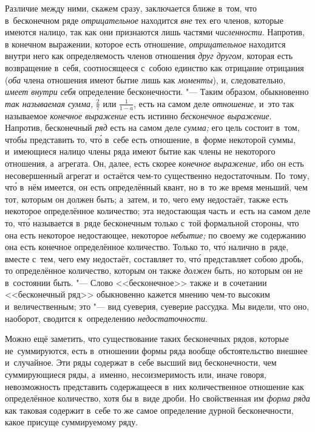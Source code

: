 Различие между ними, скажем сразу, заключается ближе в~том, что в~бесконечном
ряде {\em отрицательное} находится {\em вне} тех его членов, которые имеются
налицо, так как они признаются лишь частями {\em численности}. Напротив, в
конечном выражении, которое есть отношение, {\em отрицательное} находится
внутри него как определяемость членов отношения {\em друг другом,} которая есть
возвращение в~себя, соотносящееся с~собою единство как отрицание отрицания
({\em оба} члена отношения имеют бытие лишь как {\em моменты}), и,
следовательно, {\em имеет внутри себя} определение бесконечности. "--- Таким
образом, обыкновенно {\em так называемая сумма,} $\frac 2 7$ или
$\frac 1{1-a}$, есть на самом деле {\em отношение,} и~это так называемое
{\em конечное выражение} есть истинно {\em бесконечное выражение}. Напротив,
бесконечный {\em ряд} есть на самом деле {\em сумма;} его цель состоит в~том,
чтобы представить то, чт\'{о} в~себе есть отношение, в~форме некоторой суммы,
и~имеющиеся налицо члены ряда имеют бытие как члены не некоторого отношения,
а~агрегата. Он, далее, есть скорее {\em конечное выражение,} ибо он есть
несовершенный агрегат и~остаётся чем-то существенно недостаточным. По~тому,
чт\'{о} в~нём имеется, он есть определённый квант, но в~то же время
меньший, чем тот, которым он должен быть; а~затем,
и то, чего ему недостаёт, также есть некоторое определённое количество; эта
недостающая часть и~есть на самом деле то, чт\'{о} называется в~ряде
бесконечным только с~той формальной стороны, что она есть некоторое
недостающее, некоторое {\em небытие;} по своему же содержанию она есть конечное
определённое количество. Только то, чт\'{о} налично в~ряде, вместе с~тем, чего
ему недостаёт, составляет то, чт\'{о} представляет собою дробь, то определённое
количество, которым он также {\em должен} быть, но которым он не в~состоянии
быть. "--- Слово <<бесконечное>> также и~в сочетании <<бесконечный ряд>>
обыкновенно кажется мнению чем-то высоким и~величественным; это "--- вид
суеверия, суеверие рассудка. Мы видели, что оно, наоборот, сводится
к~определению {\em недостаточности}.

Можно ещё заметить, что существование таких бесконечных рядов, которые
не~суммируются, есть в~отношении формы ряда вообще обстоятельство внешнее
и~случайное. Эти ряды содержат в~себе высший вид бесконечности, чем
суммирующиеся ряды, а~именно, несоизмеримость или, иначе говоря, невозможность
представить содержащееся в~них количественное отношение как
определённое количество, хотя бы в~виде дроби. Но свойственная им
{\em форма ряда} как таковая содержит в~себе то же самое определение дурной
бесконечности, какое присуще суммируемому ряду.

